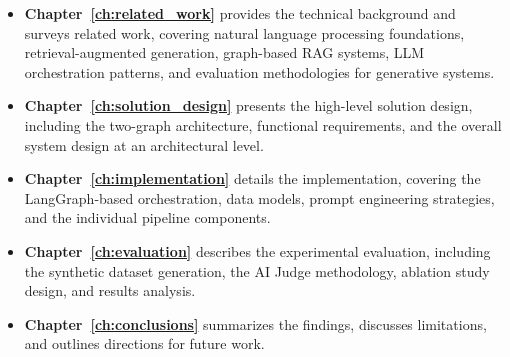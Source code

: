 \begin{itemize}
    \item \textbf{Chapter~\ref{ch:related_work}} provides the technical background and surveys related work, covering natural language processing foundations, retrieval-augmented generation, graph-based RAG systems, LLM orchestration patterns, and evaluation methodologies for generative systems.

    \item \textbf{Chapter~\ref{ch:solution_design}} presents the high-level solution design, including the two-graph architecture, functional requirements, and the overall system design at an architectural level.

    \item \textbf{Chapter~\ref{ch:implementation}} details the implementation, covering the LangGraph-based orchestration, data models, prompt engineering strategies, and the individual pipeline components.

    \item \textbf{Chapter~\ref{ch:evaluation}} describes the experimental evaluation, including the synthetic dataset generation, the AI Judge methodology, ablation study design, and results analysis.

    \item \textbf{Chapter~\ref{ch:conclusions}} summarizes the findings, discusses limitations, and outlines directions for future work.
\end{itemize}
